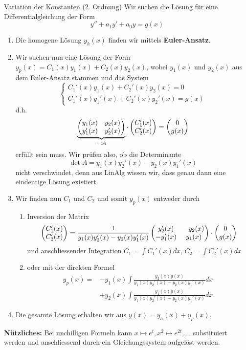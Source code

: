 \begin{Rezept}{Variation der Konstanten (2. Ordnung)}{}
	Wir suchen die Lösung für eine Differentialgleichung der Form
	\begin{equation*}
	y'' + a_1 y' + a_0 y = g(x)
	\end{equation*}
	\begin{enumerate}
		\item Die homogene Lösung $y_h(x)$ finden wir mittels \textbf{Euler-Ansatz}.
		\item Wir suchen nun eine Lösung der Form $y_p(x) = C_1(x) y_1(x) + C_2(x) y_2(x)$, wobei $y_1(x)$ und $y_2(x)$ aus dem Euler-Ansatz stammen und das System
		\begin{equation*}
		\begin{cases} C_1'(x)y_1(x) + C_2'(x)y_2(x)=0\\C_1'(x)y_1'(x) + C_2'(x)y_2'(x)=g(x)\end{cases}
		\end{equation*}
		d.h.
		\begin{equation*}
		\underbrace{\begin{pmatrix}
			y_1(x) &y_2(x)\\y_1'(x) &y_2'(x)
			\end{pmatrix}}_{=:A} \cdot \begin{pmatrix} C_1'(x) \\ C_2'(x)\end{pmatrix} = \begin{pmatrix} 0 \\ g(x)\end{pmatrix}
		\end{equation*}
		erfüllt sein muss. Wir prüfen also, ob die Determinante
		\begin{equation*}
		\det A = y_1(x)y_2'(x)-y_2(x)y_1'(x)
		\end{equation*}
		nicht verschwindet, denn aus LinAlg wissen wir, dass genau dann eine eindeutige Lösung existiert.
		\item  Wir finden nun $C_1$ und $C_2$ und somit $y_p(x)$ entweder durch
		\begin{enumerate}
			\item Inversion der Matrix \begin{equation*}
			\begin{pmatrix} C_1'(x) \\ C_2'(x)\end{pmatrix} = \frac{1}{y_1(x)y_2'(x)-y_2(x)y_1'(x)} \begin{pmatrix}
			y_2'(x) & -y_2(x)\\-y_1'(x) &y_1(x)
			\end{pmatrix}\cdot\begin{pmatrix} 0 \\ g(x)\end{pmatrix}
			\end{equation*}
			und anschliessender Integration $C_1 = \int C_1'(x) dx$, $C_2 = \int C_2'(x) dx$ 
			\item oder mit der direkten Formel
			\begin{align*}
			y_p(x) = &-y_1(x) \int \frac{y_2(x) g(x)}{y_1(x)y_2'(x)-y_2(x)y_1'(x)} dx\\&+ y_2(x) \int \frac{y_1(x) g(x)}{y_1(x)y_2'(x)-y_2(x)y_1'(x)}dx.
			\end{align*}
		\end{enumerate}
		\item Die gesamte Lösung erhalten wir aus $y(x) = y_h(x) + y_p(x)$.
	\end{enumerate}
	
	\textbf{Nützliches:} Bei unchilligen Formeln kann $x\mapsto e^t, x^2\mapsto e^{2t},...$ substituiert werden und anschliessend durch ein Gleichungssystem aufgelöst werden.
\end{Rezept}

